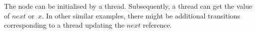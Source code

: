 


The node can be initialised by a thread.  Subsequently, a thread
can get the value of $next$ or~$x$.  In other similar examples, there might be
additional transitions corresponding to a thread updating the $next$
reference.

